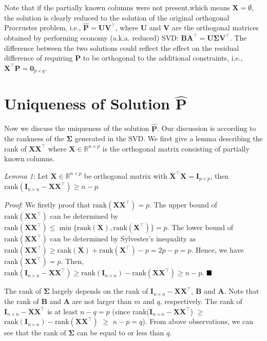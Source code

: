 \documentclass[titlepage,11pt,twoside]{article}
\let\oldemptyset\emptyset
\let\emptyset\varnothing
\begin{document}
Note that if the partially known columns were not present,which means $\mathbf{X}=\oldemptyset$, the solution is clearly reduced to the solution of the original orthogonal Procrustes problem, i.e., $\mathbf{\hat{P}} = \mathbf{U}\mathbf{V}^{\top}$, where $\mathbf{U}$ and $\mathbf{V}$ are the orthogonal matrices obtained by performing economy (a.k.a. reduced) SVD:
$\mathbf{B}\mathbf{A}^{\top} = \mathbf{U}\mathbf{\mathbf{\Sigma}}\mathbf{V}^{\top}$. 
The difference between the two solutions could reflect the effect on the residual difference of requiring $\mathbf{P}$ to be orthogonal to the additional constraints, i.e., $\mathbf{X}^{\top}\mathbf{P}=\mathbf{0}_{p\times q}$.


\section{Uniqueness of Solution $\mathbf{\hat{P}}$}

Now we discuss the uniqueness of the solution $\mathbf{\hat{P}}$. Our discussion is according to the rankness of the $\mathbf{\Sigma}$ generated in the SVD. We first give a lemma describing the rank of $\mathbf{X}\mathbf{X}^{\top}$ where $\mathbf{X}\in\mathbb{R}^{n\times p}$ is the orthogonal matrix consisting of partially known columns. 

\emph{Lemma 1}: Let $\mathbf{X}\in\mathbb{R}^{n\times p}$ be orthogonal matrix with $\mathbf{X}^{\top}\mathbf{X}=\mathbf{I}_{p\times p}$, then $\text{rank}(\mathbf{I}_{n\times n}-\mathbf{X}\mathbf{X}^{\top})\ge n-p$.

\emph{Proof}: We firstly proof that $\text{rank}(\mathbf{X}\mathbf{X}^{\top})=p$. The upper bound of $\text{rank}(\mathbf{X}\mathbf{X}^{\top})$ can be determined by $\text{rank}(\mathbf{X}\mathbf{X}^{\top})\le\min\{\text{rank}(\mathbf{X}),\text{rank}(\mathbf{X}^{\top})\}=p$. The lower bound of $\text{rank}(\mathbf{X}\mathbf{X}^{\top})$ can be determined by Sylvester's inequality as $\text{rank}(\mathbf{X}\mathbf{X}^{\top})\ge\text{rank}(\mathbf{X})+\text{rank}(\mathbf{X}^{\top})-p=2p-p=p$. Hence, we have $\text{rank}(\mathbf{X}\mathbf{X}^{\top})=p$. Then, $\text{rank}(\mathbf{I}_{n\times n}-\mathbf{X}\mathbf{X}^{\top})\ge\text{rank}(\mathbf{I}_{n\times n})-\text{rank}(\mathbf{X}\mathbf{X}^{\top})\ge n-p$. 
$\hfill\blacksquare$ 

The rank of $\mathbf{\Sigma}$ largely depends on the rank of $\mathbf{I}_{n\times n}-\mathbf{X}\mathbf{X}^{\top}$, $\mathbf{B}$ and $\mathbf{A}$. Note that the rank of $\mathbf{B}$ and $\mathbf{A}$ are not larger than $m$ and $q$, respectively. The rank of $\mathbf{I}_{n\times n}-\mathbf{X}\mathbf{X}^{\top}$ is at least $n-q=p$ (since rank($\mathbf{I}_{n\times n}-\mathbf{X}\mathbf{X}^{\top}$) $\ge$ $\text{rank}(\mathbf{I}_{n\times n}) - \text{rank}(\mathbf{X}\mathbf{X}^{\top})$ $\ge$ $n-p=q$). From above observations, we can see that the rank of $\mathbf{\Sigma}$ can be equal to or less than $q$. 
\end{document}
